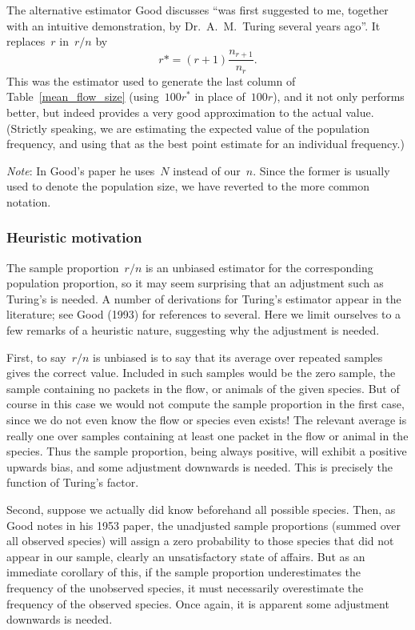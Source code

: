 \documentclass{paper}
\begin{document}
The alternative estimator Good discusses ``was first suggested to me, together
with an intuitive demonstration, by Dr.\ A.\ M.\ Turing several years ago''. It
replaces~$r$ in~$r/n$ by
$$ r* = (r + 1) \frac{n_{r+1}}{n_r}. $$
This was the estimator used to generate the last column of
Table~\ref{mean_flow_size} (using~$100r^*$ in place of~$100r$), and it not only
performs better, but indeed provides a very good approximation to the actual
value. (Strictly speaking, we are estimating the expected value of the
population frequency, and using that as the best point estimate for an
individual frequency.)

\emph{Note}: In Good's paper he uses~$N$ instead of our~$n$. Since the former is
usually used to denote the population size, we have reverted to the more common
notation.

\subsubsection{Heuristic motivation}

The sample proportion~$r/n$ is an unbiased estimator for the corresponding
population proportion, so it may seem surprising that an adjustment such as
Turing's is needed. A number of derivations for Turing's estimator appear in the
literature; see Good (1993) for references to several. Here we limit ourselves
to a few remarks of a heuristic nature, suggesting why the adjustment is needed.

First, to say~$r/n$ is unbiased is to say that its average over repeated samples
gives the correct value. Included in such samples would be the zero sample, the
sample containing no packets in the flow, or animals of the given species. But
of course in this case we would not compute the sample proportion in the first
case, since we do not even know the flow or species even exists! The relevant
average is really one over samples containing at least one packet in the flow or
animal in the species. Thus the sample proportion, being always positive, will
exhibit a positive upwards bias, and some adjustment downwards is needed. This
is precisely the function of Turing's factor.

Second, suppose we actually did know beforehand all possible species. Then, as
Good notes in his 1953 paper, the unadjusted sample proportions (summed over all
observed species) will assign a zero probability to those species that did not
appear in our sample, clearly an unsatisfactory state of affairs. But as an
immediate corollary of this, if the sample proportion underestimates the
frequency of the unobserved species, it must necessarily overestimate the
frequency of the observed species. Once again, it is apparent some adjustment
downwards is needed.
\end{document}
